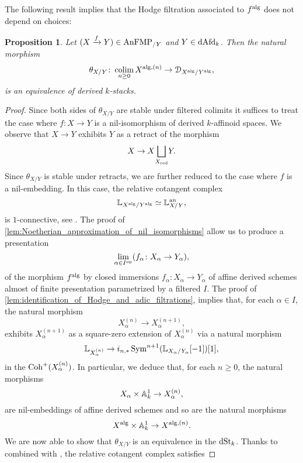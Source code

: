 \documentclass[10pt,a4paper,reqno]{amsart} %
\theoremstyle{plain}
\newtheorem{prop}[thm]{Proposition}
\theoremstyle{definition}
\theoremstyle{remark}
\numberwithin{equation}{section}
\begin{document}
The following result implies that the Hodge filtration associated to $f^\mathrm{alg}$ does not depend on choices:

\begin{prop} \label{cor:commutation_between_limit_and_colimit_on_Hodge_filtration}
    Let $(X \xrightarrow{f} Y) \in \mathrm{AnFMP}_{/ Y}$ and $Y \in \mathrm{dAfd}_k$. Then the natural morphism
        \[
            \theta_{X/ Y} \colon \operatorname*{colim}_{n \ge 0} X^{\mathrm{alg}, (n)} \to \mathcal D_{X^\mathrm{alg}/ Y^\mathrm{alg}},
        \] 
    is an equivalence of derived $k$-stacks.
\end{prop}

\begin{proof}
    Since both sides of $\theta_{X/ Y}$ are stable under filtered colimits it suffices to treat the case where $f \colon X \to Y$
    is a nil-isomorphism of derived $k$-affinoid spaces. We observe that $X \to Y$ exhibits $Y$ as a retract of the morphism
        \[
            X \to X \underset{X_{\mathrm{red}}}{\bigsqcup} Y.
        \]
    Since $\theta_{X/ Y}$ is stable under retracts, we are further reduced to the case where $f$ is a nil-embedding. In this case,
    the relative cotangent complex
        \[
            \mathbb L_{X^\mathrm{alg}/ Y^\mathrm{alg}} \simeq \mathbb L^\mathrm{an}_{X/ Y},  
        \]
    is $1$-connective, see \cite[Lemma 6.9]{Porta_Yu_NQK}. The proof of \cref{lem:Noetherian_approximation_of_nil_isomorphisms} allow us to produce a presentation
        \[
            \lim_{\alpha \in I^\mathrm{op}} (f_\alpha \colon X_\alpha \to Y_\alpha),  
        \]
    of the morphism $f^\mathrm{alg}$ by closed immersions $f_\alpha \colon X_\alpha \to Y_\alpha$ of affine
    derived schemes almost of finite presentation parametrized by a filtered \infcat $I$. The proof of \cref{lem:identification_of_Hodge_and_adic_filtrations},
    implies that, for each $\alpha \in I$, the natural morphism
        \[
            X_\alpha^{(n)} \to X_\alpha^{(n+1)},
        \]
    exhibits $X_\alpha^{(n+1)}$ as a square-zero extension of $X_\alpha^{(n)}$ via a natural morphism
        \[
            \mathbb L_{X_\alpha^{(n)}} \to i_{n, *} \operatorname{Sym}^{n+1}(\mathbb L_{X_\alpha/ Y_\alpha}[-1])[1],  
        \]
    in the \infcat $\mathrm{Coh}^+(X_\alpha^{(n)})$. In particular, we deduce that, for each $n \ge 0$, the natural morphisms
        \[
            X_\alpha \times \mathbb A^1_k \to X_\alpha^{(n)},  
        \]
    are nil-embeddings of affine derived schemes and so are the natural morphisms
        \[
            X ^\mathrm{alg} \times \mathbb A^1_k \to X^{\mathrm{alg}, (n)}.  
        \]
    We are now able to show that $\theta_{X/ Y}$ is an equivalence in the \infcat $\mathrm{dSt}_k$.
    Thanks to \cite[Corollary 4.4.1.3]{Lurie_SAG} combined with \cite[Corollary 4.5.1.3]{Lurie_SAG}, the relative cotangent complex satisfies

\end{proof}
\end{document}
